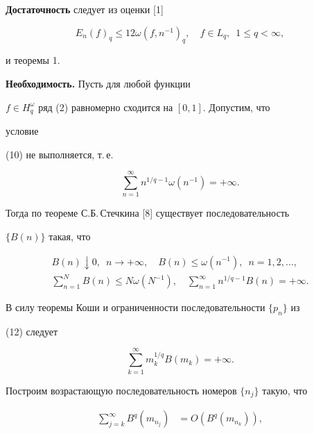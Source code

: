  


\begin{pf} 


{\bf Достаточность} следует из оценки [1] 


$$ 


E_n(f)_q\le12\omega(f,n^{-1})_q,\quad 


f\in L_q,\ \; 1\le q<\infty, 


$$ 


и теоремы 1. 


 


{\bf Необходимость.} Пусть для любой функции 


$f\in H^\omega_q$ ряд (2) равномерно сходится на $[0,1]$. Допустим, что 


условие 


(10) не выполняется, т.\,е. 


$$ 


\sum^\infty_{n=1}n^{1/q-1}\omega(n^{-1})=+\infty. 


$$ 


Тогда по теореме С.Б.\,Стечкина [8] существует последовательность 


$\{B(n)\}$ такая, что 


\begin{gather} 


B(n)\downarrow0,\ \; n\to+\infty,\quad 


B(n)\le\omega(n^{-1}),\ \; n=1,2,\dotsc, \\ 


% 


\sum^N_{n=1}B(n)\le N\omega(N^{-1}),\quad 


\sum^\infty_{n=1}n^{1/q-1}B(n)=+\infty. 


\end{gather} 


В силу теоремы Коши и ограниченности последовательности $\{p_n\}$ из 


(12) следует 


\begin{equation} 


\sum^\infty_{k=1}m^{1/q}_k B(m_k)=+\infty. 


\end{equation} 


Построим возрастающую последовательность номеров $\{n_j\}$ такую, что 


\begin{align} 


\sum^\infty_{j=k}B^q(m_{n_j})&=O(B^q(m_{n_k})),\\ 



\end{align}
\end{pf}
